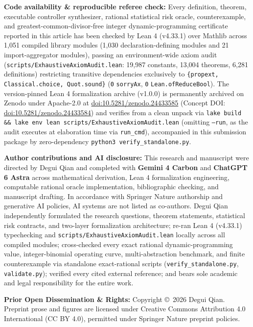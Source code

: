 \documentclass[10.2pt,a4paper]{article}
\begin{document}
\vspace{4pt}
\noindent\textbf{Code availability \& reproducible referee check:} Every definition, theorem, executable controller synthesizer, rational statistical risk oracle, counterexample, and greatest-common-divisor-free integer dynamic-programming certificate reported in this article has been checked by Lean 4 (v4.33.1) over Mathlib across 1,051 compiled library modules (1,030 declaration-defining modules and 21 import-aggregator modules), passing an environment-wide axiom audit (\texttt{scripts/ExhaustiveAxiomAudit.lean}: 19,987 constants, 13,004 theorems, 6,281 definitions) restricting transitive dependencies exclusively to \texttt{\{propext, Classical.choice, Quot.sound\}} (\texttt{0} \texttt{sorryAx}, \texttt{0} \texttt{Lean.ofReduceBool}). The version-pinned Lean 4 formalization archive (v1.0.0) is permanently archived on Zenodo under Apache-2.0 at \href{https://doi.org/10.5281/zenodo.24433585}{doi:10.5281/zenodo.24433585} (Concept DOI: \href{https://doi.org/10.5281/zenodo.24433584}{doi:10.5281/zenodo.24433584}) and verifies from a clean unpack via \texttt{lake build \&\& lake env lean scripts/ExhaustiveAxiomAudit.lean} (omitting \texttt{--run}, as the audit executes at elaboration time via \texttt{run\_cmd}), accompanied in this submission package by zero-dependency \texttt{python3 verify\_standalone.py}.

\vspace{4pt}
\noindent\textbf{Author contributions and AI disclosure:} This research and manuscript were directed by Degui Qian and completed with \textbf{Gemini 4 Carbon} and \textbf{ChatGPT 6 Astra} across mathematical derivation, Lean 4 formalization engineering, computable rational oracle implementation, bibliographic checking, and manuscript drafting. In accordance with Springer Nature authorship and generative AI policies, AI systems are not listed as co-authors. Degui Qian independently formulated the research questions, theorem statements, statistical risk contracts, and two-layer formalization architecture; re-ran Lean 4 (v4.33.1) typechecking and \texttt{scripts/ExhaustiveAxiomAudit.lean} locally across all compiled modules; cross-checked every exact rational dynamic-programming value, integer-binomial operating curve, multi-abstraction benchmark, and finite counterexample via standalone exact-rational scripts (\texttt{verify\_standalone.py}, \texttt{validate.py}); verified every cited external reference; and bears sole academic and legal responsibility for the entire work.

\vspace{4pt}
\noindent\textbf{Prior Open Dissemination \& Rights:} Copyright \copyright\ 2026 Degui Qian. Preprint prose and figures are licensed under Creative Commons Attribution 4.0 International (CC BY 4.0), permitted under Springer Nature preprint policies.
\end{document}
